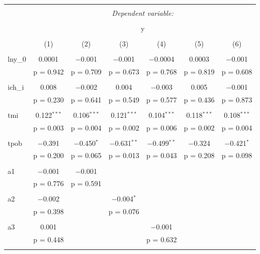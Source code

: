 \begin{table}[!htbp] \centering 
    \tiny
  \caption{} 
  \label{} 
\begin{tabular}{@{\extracolsep{5pt}}lcccccc} 
\\[-1.8ex]\hline 
\hline \\[-1.8ex] 
 & \multicolumn{6}{c}{\textit{Dependent variable:}} \\ 
\cline{2-7} 
\\[-1.8ex] & \multicolumn{6}{c}{y} \\ 
\\[-1.8ex] & (1) & (2) & (3) & (4) & (5) & (6)\\ 
\hline \\[-1.8ex] 
 lny\_0 & 0.0001 & $-$0.001 & $-$0.001 & $-$0.0004 & 0.0003 & $-$0.001 \\ 
  & p = 0.942 & p = 0.709 & p = 0.673 & p = 0.768 & p = 0.819 & p = 0.608 \\ 
  & & & & & & \\ 
 ich\_i & 0.008 & $-$0.002 & 0.004 & $-$0.003 & 0.005 & $-$0.001 \\ 
  & p = 0.230 & p = 0.641 & p = 0.549 & p = 0.577 & p = 0.436 & p = 0.873 \\ 
  & & & & & & \\ 
 tmi & 0.122$^{***}$ & 0.106$^{***}$ & 0.121$^{***}$ & 0.104$^{***}$ & 0.118$^{***}$ & 0.108$^{***}$ \\ 
  & p = 0.003 & p = 0.004 & p = 0.002 & p = 0.006 & p = 0.002 & p = 0.004 \\ 
  & & & & & & \\ 
 tpob & $-$0.391 & $-$0.450$^{*}$ & $-$0.631$^{**}$ & $-$0.499$^{**}$ & $-$0.324 & $-$0.421$^{*}$ \\ 
  & p = 0.200 & p = 0.065 & p = 0.013 & p = 0.043 & p = 0.208 & p = 0.098 \\ 
  & & & & & & \\ 
 a1 & $-$0.001 & $-$0.001 &  &  &  &  \\ 
  & p = 0.776 & p = 0.591 &  &  &  &  \\ 
  & & & & & & \\ 
 a2 & $-$0.002 &  & $-$0.004$^{*}$ &  &  &  \\ 
  & p = 0.398 &  & p = 0.076 &  &  &  \\ 
  & & & & & & \\ 
 a3 & 0.001 &  &  & $-$0.001 &  &  \\ 
  & p = 0.448 &  &  & p = 0.632 &  &  \\ 
  & & & & & & \\ 

\end{tabular}
\end{table}
